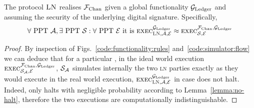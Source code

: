 \begin{theorem}
  The protocol $\textsc{LN}$ realises $\mathcal{F}_{\mathrm{Chan}}$ given a global functionality
  $\mathcal{G}_{\mathrm{Ledger}}$ and assuming the security of the underlying digital signature.
  Specifically,
  \begin{gather*}
    \forall \text{ PPT } \mathcal{A}, \exists \text{ PPT } \mathcal{S}: \forall
    \text{ PPT } \mathcal{E} \text{ it is }
    \textsc{exec}^{\mathcal{G}_{\mathrm{Ledger}}}_{\textsc{LN}, \mathcal{A}, \mathcal{E}} \approx
    \textsc{exec}^{\mathcal{F}_{\mathrm{Chan}}, \mathcal{G}_{\mathrm{Ledger}}}_{\mathcal{S}, \mathcal{E}}
  \end{gather*}
\end{theorem}

\begin{proof}
  By inspection of Figs.~\ref{code:functionality:rules}
  and~\ref{code:simulator:flow} we can deduce that for a particular
  \environment, in the ideal world execution $\textsc{exec}^{\mathcal{F}_{\mathrm{Chan}},
  \mathcal{G}_{\mathrm{Ledger}}}_{\mathcal{S}_{\mathcal{A}}, \mathcal{E}}$, $\mathcal{S}_{\mathcal{A}}$
  simulates internally the two \textsc{ln} parties exactly as they would execute
  in the real world execution, $\textsc{exec}^{\mathcal{G}_{\mathrm{Ledger}}}_{\textsc{LN},
  \mathcal{A}, \mathcal{E}}$ in case \fchan does not halt. Indeed, \fchan only
  halts with negligible probability according to Lemma~\ref{lemma:no-halt},
  therefore the two executions are computationally indistinguishable.
\end{proof}
